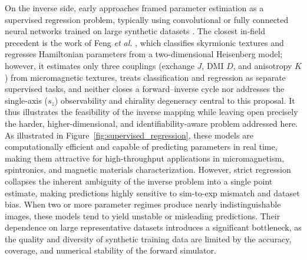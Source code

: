 \documentclass[letterpaper, 12, one column]{article}
\begin{document}
On the inverse side, early approaches framed parameter estimation as a supervised
regression problem, typically using convolutional or fully connected neural networks
trained on large synthetic datasets \cite{Feng2024}. The closest in-field precedent is the
work of Feng \emph{et al.} \cite{Feng2024}, which classifies skyrmionic textures and regresses
Hamiltonian parameters from a two-dimensional Heisenberg model; however, it estimates only
three couplings (exchange $J$, DMI $D$, and anisotropy $K$) from micromagnetic textures,
treats classification and regression as separate supervised tasks, and neither closes a
forward--inverse cycle nor addresses the single-axis ($s_z$) observability and chirality
degeneracy central to this proposal. It thus illustrates the feasibility of the inverse
mapping while leaving open precisely the harder, higher-dimensional, and identifiability-aware
problem addressed here. As illustrated in Figure~\ref{fig:supervised_regression}, these models are
computationally efficient and capable of predicting parameters in real time, making
them attractive for high-throughput applications in micromagnetism, spintronics, and
magnetic materials characterization. However, strict regression collapses the inherent
ambiguity of the inverse problem into a single point estimate, making predictions highly
sensitive to sim-to-exp mismatch and dataset bias. When two or more parameter regimes
produce nearly indistinguishable images, these models tend to yield unstable or
misleading predictions. Their dependence on large representative datasets introduces a
significant bottleneck, as the quality and diversity of synthetic training data are limited
by the accuracy, coverage, and numerical stability of the forward simulator.
\end{document}
